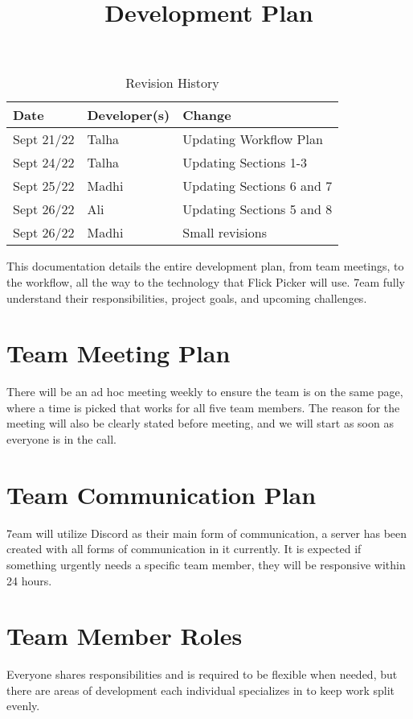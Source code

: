 \documentclass{article}
\title{Development Plan\\\progname}
\author{\authname}
\date{}
\begin{document}
\maketitle

\newpage

\begin{table}[hp]
\caption{Revision History} \label{TblRevisionHistory}
\begin{tabularx}{\textwidth}{llX}
\toprule
\textbf{Date} & \textbf{Developer(s)} & \textbf{Change}\\
\midrule
Sept 21/22 & Talha & Updating Workflow Plan\\
Sept 24/22 & Talha & Updating Sections 1-3\\
Sept 25/22 & Madhi & Updating Sections 6 and 7\\
Sept 26/22 & Ali & Updating Sections 5 and 8\\
Sept 26/22 & Madhi & Small revisions \\
\bottomrule
\end{tabularx}
\end{table}

\newpage

\tableofcontents

\newpage

This documentation details the entire development plan, from team meetings, to the workflow, all the way to the technology that Flick Picker will use. 7eam fully understand their responsibilities, project goals, and upcoming challenges.

\section{Team Meeting Plan}
There will be an ad hoc meeting weekly to ensure the team is on the same page, where a time is picked that works for all five team members. The reason for the meeting will also be clearly stated before meeting, and we will start as soon as everyone is in the call.

\section{Team Communication Plan}
7eam will utilize Discord as their main form of communication, a server has been created with all forms of communication in it currently. It is expected if something urgently needs a specific team member, they will be responsive within 24 hours.

\section{Team Member Roles}
Everyone shares responsibilities and is required to be flexible when needed, but there are areas of development each individual specializes in to keep work split evenly.
\end{document}
